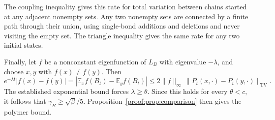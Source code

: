 The coupling inequality gives this rate for total variation between
chains started at any adjacent nonempty sets. Any two nonempty
sets are connected by a finite path through their union, using
single-bond additions and deletions and never visiting the empty
set. The triangle inequality gives the same rate for any two
initial states.

Finally, let $f$ be a nonconstant eigenfunction of $L_B$ with
eigenvalue $-\lambda$, and choose $x,y$ with $f(x)\neq f(y)$. Then
\[
 e^{-\lambda t}|f(x)-f(y)|
 =|\mathbb E_x f(B_t)-\mathbb E_y f(B_t)|
 \leq2\|f\|_\infty\,
       \|P_t(x,\cdot)-P_t(y,\cdot)\|_{\mathrm{TV}}.
\]
The established exponential bound forces $\lambda\geq\theta$.
Since this holds for every $\theta<c$, it follows that
$\gamma_B\geq\sqrt\beta/5$. Proposition~\ref{proof:prop:comparison}
then gives the polymer bound.
